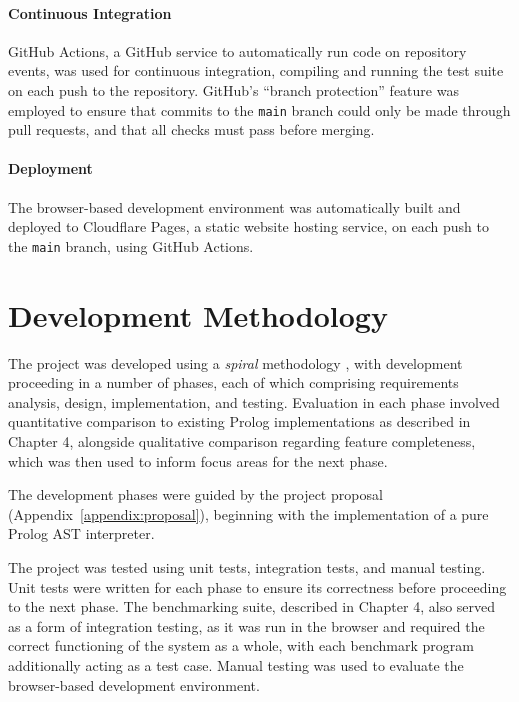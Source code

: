 \paragraph{Continuous Integration} GitHub Actions, a GitHub service to automatically run code on repository events, was used for continuous integration, compiling and running the test suite on each push to the repository. GitHub's ``branch protection'' feature was employed to ensure that commits to the \texttt{main} branch could only be made through pull requests, and that all checks must pass before merging.

\paragraph{Deployment} The browser-based development environment was automatically built and deployed to Cloudflare Pages, a static website hosting service, on each push to the \texttt{main} branch, using GitHub Actions.

\section{Development Methodology}

\label{sec:dev-methodology}

The project was developed using a \emph{spiral} methodology \cite{boehmspiralmodelsoftware1986}, with development proceeding in a number of phases, each of which comprising requirements analysis, design, implementation, and testing. Evaluation in each phase involved quantitative comparison to existing Prolog implementations as described in Chapter 4, alongside qualitative comparison regarding feature completeness, which was then used to inform focus areas for the next phase.

The development phases were guided by the project proposal (Appendix~\ref{appendix:proposal}), beginning with the implementation of a pure Prolog AST interpreter.

The project was tested using unit tests, integration tests, and manual testing. Unit tests were written for each phase to ensure its correctness before proceeding to the next phase. The benchmarking suite, described in Chapter 4, also served as a form of integration testing, as it was run in the browser and required the correct functioning of the system as a whole, with each benchmark program additionally acting as a test case. Manual testing was used to evaluate the browser-based development environment.

